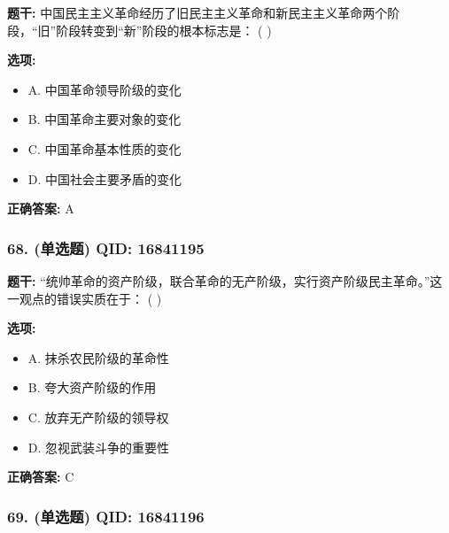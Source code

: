 \documentclass[12pt,UTF8]{ctexart}
\begin{document}
\textbf{题干:}
中国民主主义革命经历了旧民主主义革命和新民主主义革命两个阶段，“旧”阶段转变到“新”阶段的根本标志是： ( )

\textbf{选项:}
\begin{itemize}[leftmargin=*]

  \item A. 中国革命领导阶级的变化

  \item B. 中国革命主要对象的变化

  \item C. 中国革命基本性质的变化

  \item D. 中国社会主要矛盾的变化

\end{itemize}

\textbf{正确答案:}
A

\vspace{0.3em}\hrulefill\vspace{0.7em}

\subsubsection*{68. (单选题) \small QID: 16841195}

\textbf{题干:}
“统帅革命的资产阶级，联合革命的无产阶级，实行资产阶级民主革命。”这一观点的错误实质在于： ( )

\textbf{选项:}
\begin{itemize}[leftmargin=*]

  \item A. 抹杀农民阶级的革命性

  \item B. 夸大资产阶级的作用

  \item C. 放弃无产阶级的领导权

  \item D. 忽视武装斗争的重要性

\end{itemize}

\textbf{正确答案:}
C

\vspace{0.3em}\hrulefill\vspace{0.7em}

\subsubsection*{69. (单选题) \small QID: 16841196}
\end{document}
